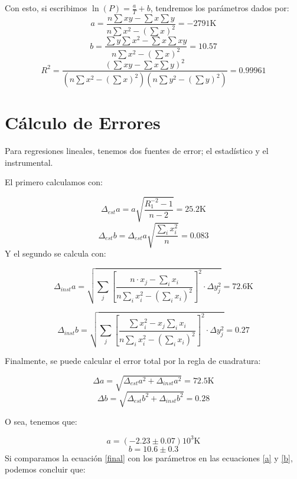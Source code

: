 \documentclass[a4paper,12pt]{article}
\begin{document}
Con esto, si escribimos $\ln(P) = \frac{a}{T} + b$, tendremos los parámetros dados por:
\begin{equation}
  a = \frac{n\sum x y - \sum x \sum y}{n \sum x^2 - \left(\sum x\right)^2}= -2791\text{K}
\end{equation}
\begin{equation}
  b = \frac{\sum y \sum x^2 - \sum x \sum x y}{n\sum x^2 - \left(\sum x \right)^2}= 10.57
\end{equation}
$$R^2=\frac{\left(\sum x y -\sum x \sum y\right)^2}{\left(n\sum x^2 - \left(\sum x\right)^2\right)\left(n\sum y^2 - \left(\sum y\right)^2\right)} = 0.99961$$ 


\section{Cálculo de Errores}
Para regresiones lineales, tenemos dos fuentes de error; el estadístico y el instrumental.

El primero calculamos con:

$$\Delta_{est} a= a\sqrt{\frac{R_1^{-2}-1}{n-2}} =25.2\text{K}$$ 
$$\Delta_{est} b = \Delta_{est} a\sqrt{\frac{\sum_i x_i^2}{n}} = 0.083$$
Y el segundo se calcula con:

  $$\Delta_{inst} a = \sqrt{\sum_j\left[ \frac{n\cdot x_j - \sum_ix_i}{n\sum_i x_i^2-\left(  \sum_i  x_i\right)^2} \right]^2 \cdot \Delta y_j^2} =72.6 \text{K}$$ 

  $$\Delta_{inst} b =\sqrt{\sum_j\left[ \frac{\sum x_i^2 -x_j \sum_i x_i}{n\sum_i x_i^2-\left(  \sum_i  x_i\right)^2} \right]^2 \cdot \Delta y_j^2} = 0.27 $$

Finalmente, se puede calcular el error total por la regla de cuadratura:

\begin{equation}
  \Delta a = \sqrt{\Delta_{est} a^2 + \Delta_{inst} a^2} = 72.5\text{K}
\end{equation}
\begin{equation}
  \Delta b = \sqrt{\Delta_{est} b^2 + \Delta_{inst} b^2} = 0.28
\end{equation}

O sea, tenemos que:

\begin{equation}
  \label{a}
  a = (-2.23\pm 0.07) 10^{3} \text{K}
\end{equation}
\begin{equation}
  \label{b}
  b = 10.6\pm 0.3
\end{equation}
Si comparamos la ecuación \eqref{final} con los parámetros en las ecuaciones \eqref{a} y \eqref{b}, podemos concluir que:
\end{document}
